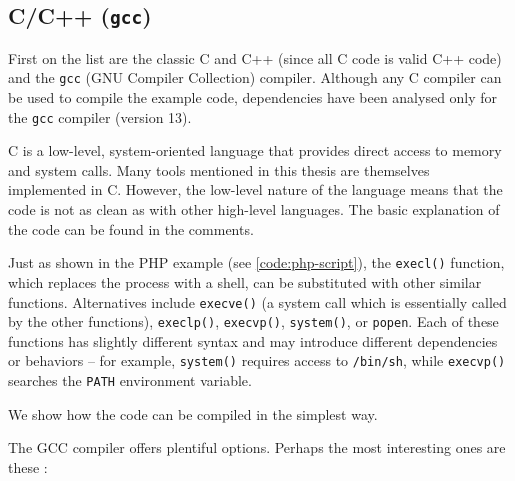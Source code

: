 \subsection{C/C++ (\texttt{gcc})}
\label{sec:gcc}


First on the list are the classic C and C++ (since all C code is valid C++ code) and the \texttt{gcc} (GNU Compiler Collection) compiler. Although any C compiler can be used to compile the example code, dependencies have been analysed only for the \texttt{gcc} compiler (version 13).

C is a low-level, system-oriented language that provides direct access to memory and system calls. Many tools mentioned in this thesis are themselves implemented in C. However, the low-level nature of the language means that the code is not as clean as with other high-level languages. The basic explanation of the code can be found in the comments.


Just as shown in the PHP example (see \cref{code:php-script}), the \texttt{execl()} function, which replaces the process with a shell, can be substituted with other similar functions. Alternatives include \texttt{execve()} (a system call which is essentially called by the other functions), \texttt{execlp()}, \texttt{execvp()}, \texttt{system()}, or \texttt{popen}. Each of these functions has slightly different syntax and may introduce different dependencies or behaviors -- for example, \texttt{system()} requires access to \texttt{/bin/sh}, while \texttt{execvp()} searches the \texttt{PATH} environment variable.

We show how the code can be compiled in the simplest way.


The GCC compiler offers plentiful options. Perhaps the most interesting ones are these \cite{gcc-man}:


